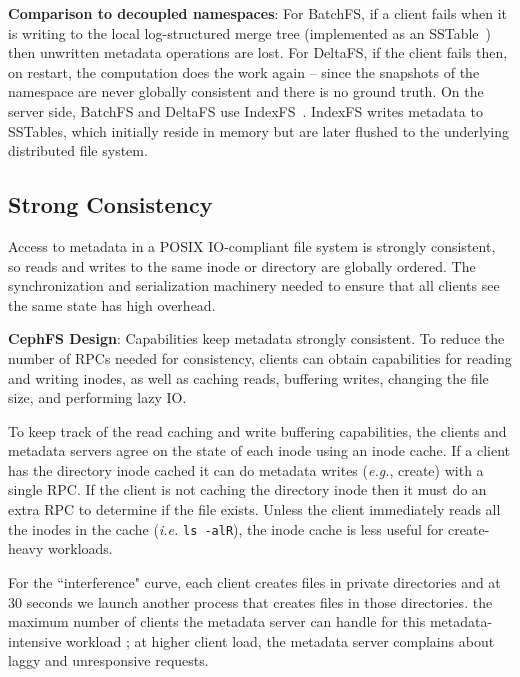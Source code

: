 \textbf{Comparison to decoupled namespaces}: For BatchFS, if a client fails
when it is writing to the local log-structured merge tree (implemented as an
SSTable~\cite{ren:atc2013-tablefs}) then unwritten metadata operations are
lost. For DeltaFS, if the client fails then, on restart, the computation does
the work again -- since the snapshots of the namespace are never globally
consistent and there is no ground truth.  On the server side, BatchFS and
DeltaFS use IndexFS~\cite{ren:sc2014-indexfs}. IndexFS writes metadata to
SSTables, which initially reside in memory but are later flushed to the
underlying distributed file system.

\subsection{Strong Consistency}
\label{sec:strong-consistency}

Access to metadata in a POSIX IO-compliant file system is strongly consistent, so
reads and writes to the same inode or directory are globally ordered.  The
synchronization and serialization machinery needed to ensure that all clients
see the same state has high overhead.

\textbf{CephFS Design}: Capabilities keep metadata strongly
consistent. To reduce the number of RPCs needed for consistency, clients can
obtain capabilities for reading and writing inodes, as well as caching reads,
buffering writes, changing the file size, and performing lazy IO.

To keep track of the read caching and write buffering capabilities, the clients
and metadata servers agree on the state of each inode using an inode cache.  If
a client has the directory inode cached it can do metadata writes ({\it e.g.},
create) with a single RPC. If the client is not caching the directory inode
then it must do an extra RPC to determine if the file exists.  Unless the
client immediately reads all the inodes in the cache ({\it i.e.} \texttt{ls
-alR}), the inode cache is less useful for create-heavy workloads.

 For the ``interference"
curve, each client creates files in private directories and at 30 seconds we
launch another process that creates files in those directories.  the maximum number of
clients the metadata server can handle for this metadata-intensive workload
; at higher client load, the metadata server
complains about laggy and unresponsive requests.

